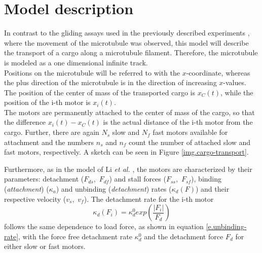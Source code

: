 \section{Model description}\label{s.model-description}
In contrast to the gliding assays used in the previously described experiments \cite{larson, bieling, jcb174}, where the movement of the microtubule was observed, this model will describe the
transport of a cargo along a microtubule filament. Therefore, the microtubule is modeled as a one dimensional infinite track.\\
Positions on the microtubule will be referred to with the \mbox{$x$-coordinate}, whereas the plus direction of the microtubule is in the direction of increasing \mbox{$x$-values.} The position of
the center of mass of the transported cargo is $x_C\left(t\right)$, while the position of the i-th motor is $x_i\left(t\right)$.\\
The motors are permanently attached to the center of mass of the cargo, so that the difference \mbox{$x_i\left(t\right) - x_{C}\left(t\right)$} is the actual distance of the i-th motor from
the cargo. Further, there are again $N_s$ slow and $N_f$ fast motors available for attachment and the numbers $n_s$ and $n_f$ count the number of attached slow and fast motors, respectively.
A sketch can be seen in Figure \ref{img.cargo-transport}.


Furthermore, as in the model of Li \textit{et al.} \cite{li}, the motors are characterized by their parameters: detachment \mbox{($F_{ds}$, $F_{df}$)} and stall forces \mbox{($F_{ss}$, $F_{sf}$)},
binding (\textit{attachment}) \mbox{($\kappa_a$)} and unbinding (\textit{detachment}) rates \mbox{($\kappa_d\left(F\right)$)} and their respective velocity \mbox{($v_s$, $v_f$)}. The detachment rate for the i-th motor
\begin{equation}\label{e.unbinding-rate-kappa_d}
 \kappa_d\left(F_i\right) = \kappa_d^0 exp\left(\frac{\vert F_i\vert}{F_d}\right)
\end{equation}
follows the same dependence to load force, as shown in equation \eqref{e.unbinding-rate}, with the force free detachment rate $\kappa_d^0$ and the detachment force $F_d$ for either slow or fast
motors.

